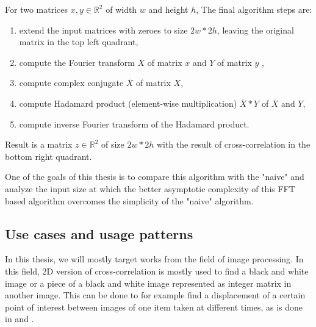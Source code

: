 For two matrices $x,y \in \mathbb{R}^2$ of width $w$ and height $h$, The final algorithm steps are:

\begin{enumerate}
	\item extend the input matrices with zeroes to size $2w*2h$, leaving the original matrix in the top left quadrant,
	\item compute the Fourier transform $X$ of matrix $x$ and $Y$ of matrix $y$ ,
	\item compute complex conjugate $\overline{X}$ of matrix $X$,
	\item compute Hadamard product (element-wise multiplication) $\overline{X}*Y$ of $\overline{X}$ and $Y$,
	\item compute inverse Fourier transform of the Hadamard product.
\end{enumerate}

Result is a matrix $z \in \mathbb{R}^2$ of size $2w*2h$ with the result of cross-correlation in the bottom right quadrant.


One of the goals of this thesis is to compare this algorithm with the "naive" and analyze the input size at which the better asymptotic complexity of this FFT based algorithm overcomes the simplicity of the "naive" algorithm.

\subsection{Use cases and usage patterns}

In this thesis, we will mostly target works from the field of image processing. In this field, 2D version of cross-correlation is mostly used to find a  black and white image or a piece of a black and white image represented as integer matrix in another image. This can be done to for example find a displacement of a certain point of interest between images of one item taken at different times, as is done in \citet{misko} and \citet{zhang2015}. 


